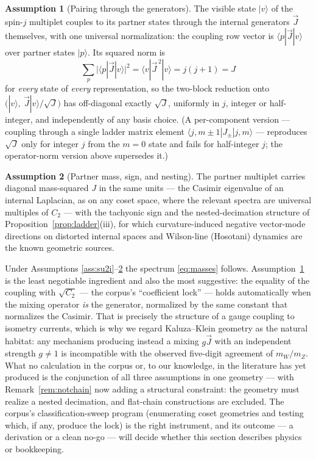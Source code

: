 \documentclass[11pt,a4paper]{article}
\theoremstyle{definition}
\newtheorem{assumption}{Assumption}
\newcommand{\Jvec}{\vec{J}}
\begin{document}
\begin{assumption}[Pairing through the generators]
\label{ass:pairing}
The visible state $|v\rangle$ of the spin-$j$ multiplet couples to its
partner states through the internal generators $\Jvec$ themselves, with one
universal normalization: the coupling row vector is
$\langle p|\Jvec|v\rangle$ over partner states $|p\rangle$. Its squared
norm is
\[
\sum_p \bigl|\langle p|\Jvec|v\rangle\bigr|^2
=\langle v|\Jvec^{\,2}|v\rangle = j(j+1) = J
\]
for \emph{every} state of \emph{every} representation, so the two-block
reduction onto $\bigl(|v\rangle,\ \Jvec|v\rangle/\sqrt J\bigr)$ has
off-diagonal exactly $\sqrt J$, uniformly in $j$, integer or half-integer,
and independently of any basis choice. (A per-component version --- coupling
through a single ladder matrix element $\langle j,m{\pm}1|J_\pm|j,m\rangle$
--- reproduces $\sqrt J$ only for integer $j$ from the $m=0$ state and
fails for half-integer $j$; the operator-norm version above supersedes it.)
\end{assumption}

\begin{assumption}[Partner mass, sign, and nesting]
\label{ass:partner}
The partner multiplet carries diagonal mass-squared $J$ in the same units
--- the Casimir eigenvalue of an internal Laplacian, as on any coset space,
where the relevant spectra are universal multiples of $C_2$
\cite{salamstrathdee1982,duffnilssonpope1986} --- with the tachyonic sign
and the nested-decimation structure of
Proposition~\ref{prop:ladder}(iii), for which curvature-induced negative
vector-mode directions on distorted internal spaces
\cite{rdss1983,duffnilssonpope1986} and Wilson-line (Hosotani) dynamics
\cite{hosotani1983} are the known geometric sources.
\end{assumption}

Under Assumptions \ref{ass:su2i}--\ref{ass:partner} the spectrum
\eqref{eq:masses} follows. Assumption~\ref{ass:pairing} is the least
negotiable ingredient and also the most suggestive: the equality of the
coupling with $\sqrt{C_2}$ --- the corpus's ``coefficient lock'' --- holds
automatically when the mixing operator \emph{is} the generator, normalized
by the same constant that normalizes the Casimir. That is precisely the
structure of a gauge coupling to isometry currents, which is why we regard
Kaluza--Klein geometry
\cite{manton1979,forgacsmanton1980,witten1981,salamstrathdee1982} as the
natural habitat: any mechanism producing instead a mixing $g\Jvec$ with an
independent strength $g\ne1$ is incompatible with the observed five-digit
agreement of $m_W/m_Z$. What no calculation in the corpus or, to our
knowledge, in the literature has yet produced is the conjunction of all
three assumptions in one geometry --- with Remark~\ref{rem:notchain} now
adding a structural constraint: the geometry must realize a nested
decimation, and flat-chain constructions are excluded. The corpus's
classification-sweep program (enumerating coset geometries and testing
which, if any, produce the lock) is the right instrument, and its outcome
--- a derivation or a clean no-go --- will decide whether this section
describes physics or bookkeeping.
\end{document}
